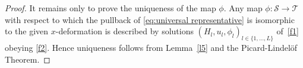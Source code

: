 \documentclass[11pt,twoside]{amsart}
\theoremstyle{plain}
\newcommand{\Sm}{\mathcal{S}}
\newcommand{\Tm}{\mathcal{T}}
\begin{document}
\begin{proof}

It remains only to prove the uniqueness of the map $\phi $. Any map $\phi:\Sm\to\Tm$ with respect to which the pullback of  \eqref {eq:universal representative} is isomorphic to the given $ x $-deformation is described by solutions $(H_l,u_l,\phi_l)_{l\in\{1,\ldots,L\}}$ of~\eqref{f1} obeying \eqref{f2}. Hence uniqueness follows from Lemma~\ref{l5} and the Picard-Lindel\"of Theorem.
\end{proof}
\end{document}
